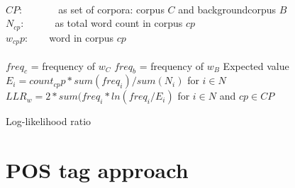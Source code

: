 \begin{algorithm}
\begin{algorithmic} 
\REQUIRE ~\\
\hspace{\algorithmicindent} $CP$: ~~~~~~ as set of corpora: corpus $C$ and backgroundcorpus $B$\\ 
\hspace{\algorithmicindent}	$N_{cp}$: ~~~~~ as total word count in corpus $cp$\\
\hspace{\algorithmicindent}	$w_{cp}p$: ~~~ word in corpus $cp$\\

\hrulefill
\ENSURE ~\\
	\STATE $freq_{c}$  = frequency of  $w_C$
	\STATE $freq_{b}$  = frequency of  $w_B$
		\STATE Expected value $E_i = count_{cp}p* sum(freq_{i})/ sum(N_{i})$ for $i \in N$
	\ENDFOR
	\STATE $ LLR_{w}= 2 * sum(freq_{i} * ln(freq_{i}/E_i) $ for $i \in N$ and $cp \in CP$
 
\ENDFOR
\end{algorithmic}
\caption[Algorithm 2]{Log-likelihood ratio}
\label{alg:llr}
\end{algorithm}

\section{POS tag approach}


